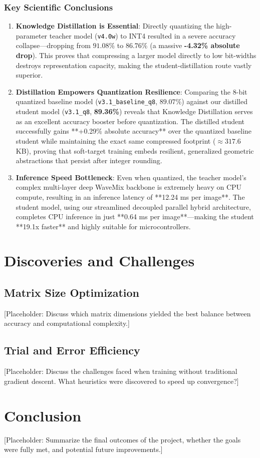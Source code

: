 \documentclass[12pt,a4paper]{article}
\begin{document}
\subsubsection{Key Scientific Conclusions}
\begin{enumerate}
    \item \textbf{Knowledge Distillation is Essential}: Directly quantizing the high-parameter teacher model (\texttt{v4.0w}) to INT4 resulted in a severe accuracy collapse—dropping from $91.08\%$ to $86.76\%$ (a massive \textbf{-4.32\% absolute drop}). This proves that compressing a larger model directly to low bit-widths destroys representation capacity, making the student-distillation route vastly superior.
    \item \textbf{Distillation Empowers Quantization Resilience}: Comparing the 8-bit quantized baseline model (\texttt{v3.1\_baseline\_q8}, $89.07\%$) against our distilled student model (\texttt{v3.1\_q8}, \textbf{89.36\%}) reveals that Knowledge Distillation serves as an excellent accuracy booster before quantization. The distilled student successfully gains **+0.29\% absolute accuracy** over the quantized baseline student while maintaining the exact same compressed footprint ($\approx 317.6$ KB), proving that soft-target training embeds resilient, generalized geometric abstractions that persist after integer rounding.
    \item \textbf{Inference Speed Bottleneck}: Even when quantized, the teacher model's complex multi-layer deep WaveMix backbone is extremely heavy on CPU compute, resulting in an inference latency of **12.24 ms per image**. The student model, using our streamlined decoupled parallel hybrid architecture, completes CPU inference in just **0.64 ms per image**—making the student **19.1x faster** and highly suitable for microcontrollers.
\end{enumerate}

\section{Discoveries and Challenges}

\subsection{Matrix Size Optimization}
[Placeholder: Discuss which matrix dimensions yielded the best balance between accuracy and computational complexity.]

\subsection{Trial and Error Efficiency}
[Placeholder: Discuss the challenges faced when training without traditional gradient descent. What heuristics were discovered to speed up convergence?]

\section{Conclusion}
 [Placeholder: Summarize the final outcomes of the project, whether the goals were fully met, and potential future improvements.]
\end{document}
